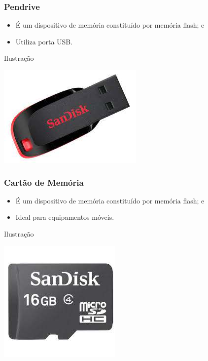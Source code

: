 \documentclass[aspectratio=169]{beamer} %
\begin{document}
\begin{frame}
	\frametitle{Pendrive}
		
	\begin{itemize}
		\item É um dispositivo de memória constituído por memória flash; e 
		\item Utiliza porta USB.
	\end{itemize}\vfill
	
	\begin{exampleblock}{Ilustra\c cão}
		\begin{center}
			\includegraphics[scale=0.4]{img/pendrive}
		\end{center}
	\end{exampleblock}
\end{frame}

\begin{frame}
	\frametitle{Cartão de Memória}
		
	\begin{itemize}
		\item É um dispositivo de memória constituído por memória flash; e 
		\item Ideal para equipamentos móveis.
	\end{itemize}\vfill
	
	\begin{exampleblock}{Ilustra\c cão}
		\begin{center}
			\includegraphics[scale=0.4]{img/cartao_de_memoria}
		\end{center}
	\end{exampleblock}
\end{frame}
\end{document}
